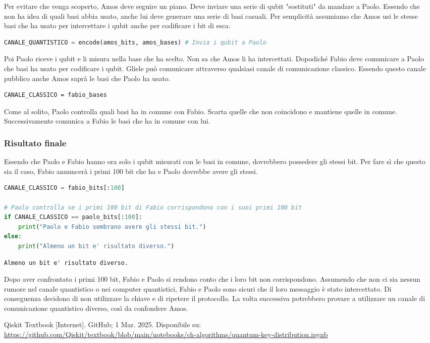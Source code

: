 \documentclass[a4paper]{article}
\begin{document}
Per evitare che venga scoperto, Amos deve seguire un piano. Deve inviare una serie di qubit
"sostituti" da mandare a Paolo. Essendo che non ha idea di quali basi abbia usato,
anche lui deve generare una serie di basi casuali. Per semplicità 
assumiamo che Amos usi le stesse basi che ha usato per intercettare i qubit anche per 
codificare i bit di esca.
\begin{lstlisting}[language=Python]
CANALE_QUANTISTICO = encode(amos_bits, amos_bases) # Invia i qubit a Paolo
\end{lstlisting}
Poi Paolo riceve i qubit e li misura nella base che ha scelto. Non sa che Amos li ha intercettati.
Dopodiché Fabio deve comunicare a Paolo che basi ha usato per codificare i qubit. 
Gliele può comunicare attraverso qualsiasi canale di comunicazione classico. Essendo questo canale pubblico
anche Amos saprà le basi che Paolo ha usato.
\begin{lstlisting}
CANALE_CLASSICO = fabio_bases
\end{lstlisting}
Come al solito, Paolo controlla quali basi ha in comune con Fabio. Scarta quelle che non
coincidono e mantiene quelle in comune.
Successivamente comunica a Fabio le basi che ha in comune con lui.

\subsubsection*{Risultato finale}

Essendo che Paolo e Fabio hanno ora solo i qubit misurati con le basi in comune, dovrebbero possedere gli stessi bit.
Per fare sì che questo sia il caso, Fabio annuncerà i primi 100 bit che ha e Paolo dovrebbe avere gli stessi.
\begin{lstlisting}[language=Python]
CANALE_CLASSICO = fabio_bits[:100] 

# Paolo controlla se i primi 100 bit di Fabio corrispondono con i suoi primi 100 bit
if CANALE_CLASSICO == paolo_bits[:100]:
    print("Paolo e Fabio sembrano avere gli stessi bit.")
else:
    print("Almeno un bit e' risultato diverso.")
\end{lstlisting}
\begin{lstlisting}
Almeno un bit e' risultato diverso.
\end{lstlisting}
Dopo aver confrontato i primi 100 bit, Fabio e Paolo
si rendono conto che i loro bit non corrispondono. Assumendo che non ci sia nessun rumore nel canale quantistico
o nei computer quantistici,
Fabio e Paolo sono sicuri che il loro messaggio è stato intercettato.
Di conseguenza decidono di non utilizzare la chiave e di ripetere il protocollo.
La volta successiva potrebbero provare a utilizzare un canale di comunicazione quantistico
diverso, così da confondere Amos.

\pagebreak

\begin{thebibliography}{9}
Qiskit Textbook [Internet]. GitHub; 1 Mar. 2025. Disponibile su:\\
\url{https://github.com/Qiskit/textbook/blob/main/notebooks/ch-algorithms/quantum-key-distribution.ipynb}
\end{thebibliography}

 
\end{document}
